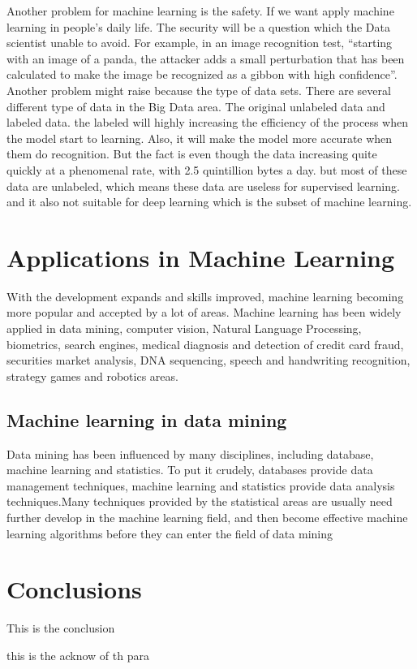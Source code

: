 \documentclass[sigconf]{acmart}
\begin{document}
Another problem for machine learning is the safety. If we want apply machine learning in people’s daily life. The security will be a question which the Data scientist unable to avoid. For example, in an image recognition test, ``starting with an image of a panda, the attacker adds a small perturbation that has been calculated to make the image be recognized as a gibbon with high confidence''\cite{Ophir}.
Another problem might raise because the type of data sets. There are several different type of data in the Big Data area. The original unlabeled data and labeled data. the labeled will highly increasing the efficiency of the process when the model start to learning. Also, it will make the model more accurate when them do recognition. But the fact is even though the data increasing quite quickly at a phenomenal rate, with 2.5 quintillion bytes a day. but most of these data are unlabeled, which means these data are useless for supervised learning. and it also not suitable for deep learning which is the subset of machine learning.
\section{Applications in Machine Learning}
With the development expands and skills improved, machine learning becoming more popular and accepted by a lot of areas. Machine learning has been widely applied in data mining, computer vision, Natural Language Processing, biometrics, search engines, medical diagnosis and detection of credit card fraud, securities market analysis, DNA sequencing, speech and handwriting recognition, strategy games and robotics areas.
\subsection{Machine learning in data mining}
Data mining has been influenced by many disciplines, including database, machine learning and statistics. To put it crudely, databases provide data management techniques, machine learning and statistics provide data analysis techniques.Many techniques provided by the statistical areas are usually need further develop in the machine learning field, and then become effective machine learning algorithms before they can enter the field of data mining\cite{Margaret01}

\section{Conclusions}

This is the conclusion



\appendix








\begin{acks}

  this is the acknow of th para

\end{acks}


 
\end{document}
